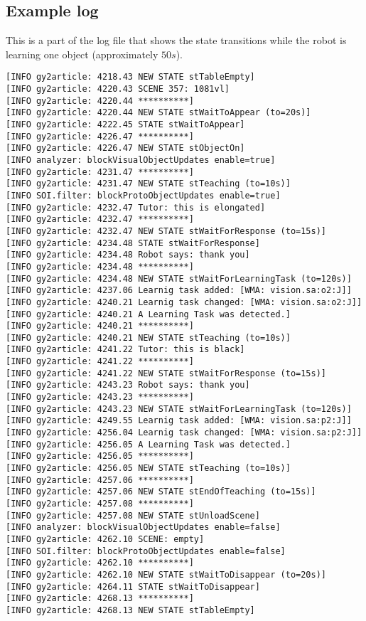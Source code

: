 \documentclass{article}
\begin{document}
\subsection{Example log}

This is a part of the log file that shows the state transitions while the robot
is learning one object (approximately $50s$).

\begin{verbatim}
[INFO gy2article: 4218.43 NEW STATE stTableEmpty]
[INFO gy2article: 4220.43 SCENE 357: 1081vl]
[INFO gy2article: 4220.44 **********]
[INFO gy2article: 4220.44 NEW STATE stWaitToAppear (to=20s)]
[INFO gy2article: 4222.45 STATE stWaitToAppear]
[INFO gy2article: 4226.47 **********]
[INFO gy2article: 4226.47 NEW STATE stObjectOn]
[INFO analyzer: blockVisualObjectUpdates enable=true]
[INFO gy2article: 4231.47 **********]
[INFO gy2article: 4231.47 NEW STATE stTeaching (to=10s)]
[INFO SOI.filter: blockProtoObjectUpdates enable=true]
[INFO gy2article: 4232.47 Tutor: this is elongated]
[INFO gy2article: 4232.47 **********]
[INFO gy2article: 4232.47 NEW STATE stWaitForResponse (to=15s)]
[INFO gy2article: 4234.48 STATE stWaitForResponse]
[INFO gy2article: 4234.48 Robot says: thank you]
[INFO gy2article: 4234.48 **********]
[INFO gy2article: 4234.48 NEW STATE stWaitForLearningTask (to=120s)]
[INFO gy2article: 4237.06 Learnig task added: [WMA: vision.sa:o2:J]]
[INFO gy2article: 4240.21 Learnig task changed: [WMA: vision.sa:o2:J]]
[INFO gy2article: 4240.21 A Learning Task was detected.]
[INFO gy2article: 4240.21 **********]
[INFO gy2article: 4240.21 NEW STATE stTeaching (to=10s)]
[INFO gy2article: 4241.22 Tutor: this is black]
[INFO gy2article: 4241.22 **********]
[INFO gy2article: 4241.22 NEW STATE stWaitForResponse (to=15s)]
[INFO gy2article: 4243.23 Robot says: thank you]
[INFO gy2article: 4243.23 **********]
[INFO gy2article: 4243.23 NEW STATE stWaitForLearningTask (to=120s)]
[INFO gy2article: 4249.55 Learnig task added: [WMA: vision.sa:p2:J]]
[INFO gy2article: 4256.04 Learnig task changed: [WMA: vision.sa:p2:J]]
[INFO gy2article: 4256.05 A Learning Task was detected.]
[INFO gy2article: 4256.05 **********]
[INFO gy2article: 4256.05 NEW STATE stTeaching (to=10s)]
[INFO gy2article: 4257.06 **********]
[INFO gy2article: 4257.06 NEW STATE stEndOfTeaching (to=15s)]
[INFO gy2article: 4257.08 **********]
[INFO gy2article: 4257.08 NEW STATE stUnloadScene]
[INFO analyzer: blockVisualObjectUpdates enable=false]
[INFO gy2article: 4262.10 SCENE: empty]
[INFO SOI.filter: blockProtoObjectUpdates enable=false]
[INFO gy2article: 4262.10 **********]
[INFO gy2article: 4262.10 NEW STATE stWaitToDisappear (to=20s)]
[INFO gy2article: 4264.11 STATE stWaitToDisappear]
[INFO gy2article: 4268.13 **********]
[INFO gy2article: 4268.13 NEW STATE stTableEmpty]
\end{verbatim}
\end{document}
